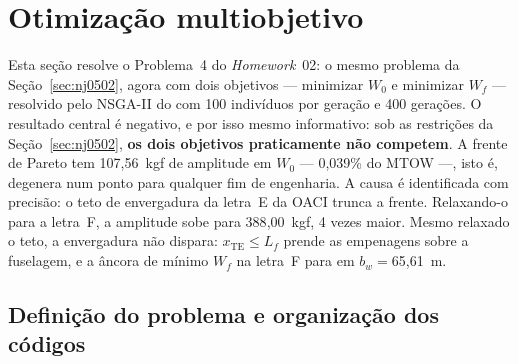 %

\section{Otimização multiobjetivo}
\label{sec:multiobjetivo}

\noindent
Esta seção resolve o Problema~4 do \emph{Homework}~02: o mesmo problema da
Seção~\ref{sec:nj0502}, agora com dois objetivos --- minimizar $W_0$ e
minimizar $W_f$ --- resolvido pelo NSGA-II do  com
100 indivíduos por geração e 400 gerações. O resultado central
é negativo, e por isso mesmo informativo: sob as restrições da
Seção~\ref{sec:nj0502}, \textbf{os dois objetivos praticamente não
competem}. A frente de Pareto tem 107{,}56~kgf de amplitude em
$W_0$ --- 0{,}039\% do MTOW ---, isto é, degenera num ponto para
qualquer fim de engenharia. A causa é identificada com precisão: o teto
de envergadura da letra~E da OACI trunca a frente. Relaxando-o para a
letra~F, a amplitude sobe para 388{,}00~kgf, 4 vezes
maior. Mesmo relaxado o teto, a envergadura não dispara:
$x_{\mathrm{TE}}\le L_f$ prende as empenagens sobre a fuselagem, e a âncora de
mínimo $W_f$ na letra~F para em $b_w=$65{,}61~m.

\subsection{Definição do problema e organização dos códigos}
\label{sec:p4def}

